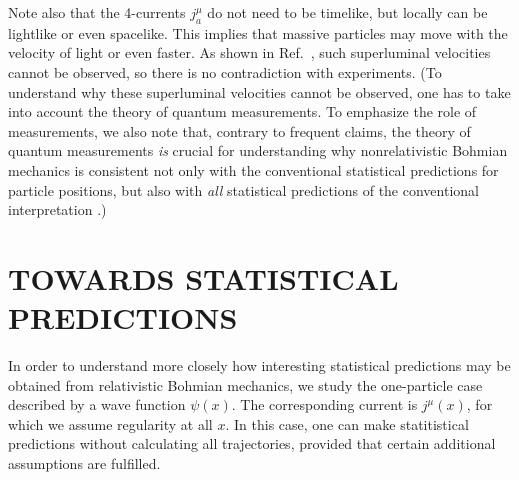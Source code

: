 \documentclass[11pt]{article}
\begin{document}
Note also that the 4-currents $j^{\mu}_a$ do not need 
to be timelike, but locally can be lightlike or even spacelike.
This implies that massive particles may move with the 
velocity of light or even faster. As shown in Ref.~\cite{nikoldbb1},
such superluminal velocities cannot be observed, so there is no 
contradiction with experiments.  
(To understand why these superluminal velocities cannot be observed, 
one has to take into account the theory 
of quantum measurements. To emphasize the role of measurements, 
we also note that, contrary to frequent claims,
the theory of quantum measurements 
{\em is} crucial for understanding why nonrelativistic Bohmian 
mechanics is consistent not only
with the conventional statistical predictions for particle positions,
but also with {\em all} statistical 
predictions of the conventional interpretation
\cite{bohm,bohmPR1,holbook,nikoldbb1}.)  

\section{TOWARDS STATISTICAL PREDICTIONS}
\label{secSP}

In order to understand more closely how interesting 
statistical predictions may be obtained from relativistic
Bohmian mechanics, we study the one-particle case described by a 
wave function $\psi(x)$. The corresponding
current is $j^{\mu}(x)$, for which we assume regularity  
at all $x$. In this case,
one can make statitistical predictions without calculating 
all trajectories, provided that certain additional 
assumptions are fulfilled. 
\end{document}

